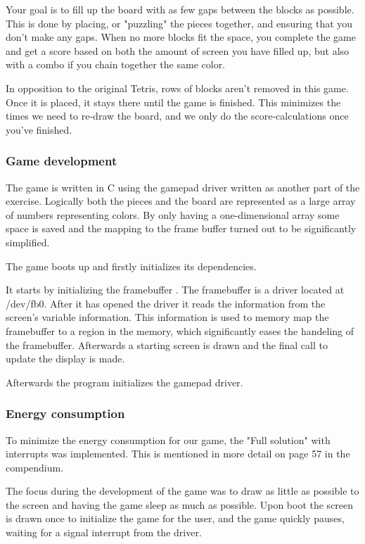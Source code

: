 Your goal is to fill up the board with as few gaps between the blocks as possible.
This is done by placing, or "puzzling" the pieces together, and ensuring that you don't make any gaps.
When no more blocks fit the space, you complete the game and get a score based on both the amount of screen you have filled up, but also with a combo if you chain together the same color.

In opposition to the original Tetris, rows of blocks aren't removed in this game.
Once it is placed, it stays there until the game is finished. This minimizes the times we need to re-draw the board, and we only do the score-calculations once you've finished.

\subsubsection{Game development}

The game is written in C using the gamepad driver written as another part of the exercise.
Logically both the pieces and the board are represented as a large array of numbers representing colors.
By only having a one-dimensional array some space is saved and the mapping to the frame buffer turned out to be significantly simplified.

The game boots up and firstly initializes its dependencies.

It starts by initializing the framebuffer \cite{internet-linux-fb}.
The framebuffer is a driver located at /dev/fb0.
After it has opened the driver it reads the information from the screen's variable information.
This information is used to memory map the framebuffer to a region in the memory, which significantly eases the handeling of the framebuffer.
Afterwards a starting screen is drawn and the final call to update the display is made.

Afterwards the program initializes the gamepad driver.

\subsubsection{Energy consumption}

To minimize the energy consumption for our game, the "Full solution" with interrupts was implemented.
This is mentioned in more detail on page 57 in the compendium.

The focus during the development of the game was to draw as little as possible to the screen and having the game sleep as much as possible.
Upon boot the screen is drawn once to initialize the game for the user, and the game quickly pauses, waiting for a signal interrupt from the driver.

